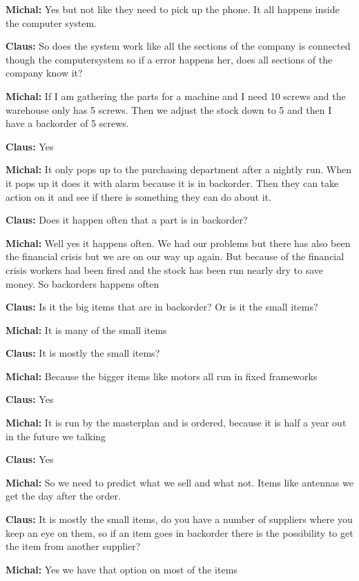 \textbf{Michal:} Yes but not like they need to pick up the phone. It all
happens inside the computer system.\nl

\textbf{Claus:} So does the system work like all the sections of the company is
connected though the computersystem so if a error happens her, does all sections
of the company know it? \nl

\textbf{Michal:} If I am gathering the parts for a machine and I need 10 screws
and the warehouse only has 5 screws. Then we adjust the stock down to 5 and then
I have a backorder of 5 screws.\nl

\textbf{Claus:} Yes \nl

\textbf{Michal:} It only pops up to the purchasing department after a nightly
run. When it pops up it does it with alarm because it is in backorder. Then they
can take action on it and see if there is something they can do about it.\nl

\textbf{Claus:} Does it happen often that a part is in backorder?\nl
 
\textbf{Michal:} Well yes it happens often. We had our problems but there has
also been the financial crisis but we are on our way up again. But because of
the financial crisis workers had been fired and the stock has been run nearly
dry to save money. So backorders happens often\nl

\textbf{Claus:} Is it the big items that are in backorder? Or is it the small
items? \nl

\textbf{Michal:} It is many of the small items \nl

\textbf{Claus:} It is mostly the small items?\nl

\textbf{Michal:} Because the bigger items like motors all run in fixed
frameworks\nl

\textbf{Claus:} Yes \nl

\textbf{Michal:} It is run by the masterplan and is ordered, because it is half
a year out in the future we talking\nl

\textbf{Claus:} Yes \nl

\textbf{Michal:} So we need to predict what we sell and what not. Items like
antennas we get the day after the order. \nl

\textbf{Claus:} It is mostly the small items, do you have a number of suppliers
where you keep an eye on them, so if an item goes in backorder there is the
possibility to get the item from another supplier? \nl

\textbf{Michal:} Yes we have that option on most of the items\nl

